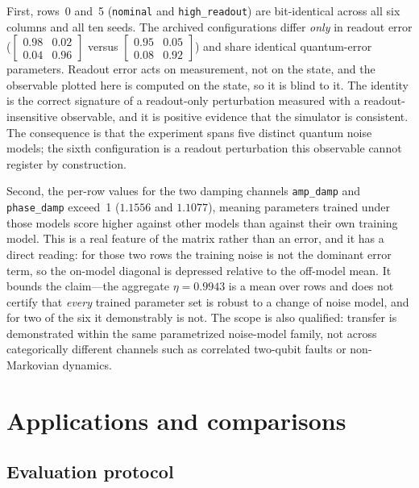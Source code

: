 \documentclass[twocolumn,aps,prl,superscriptaddress,showkeys]{revtex4-2}
\theoremstyle{plain}
\theoremstyle{definition}
\begin{document}
First, rows~0 and~5 (\texttt{nominal} and \texttt{high\_readout}) are bit-identical across all six columns and all ten seeds. The archived configurations differ \emph{only} in readout error ($\left[\begin{smallmatrix}0.98&0.02\\0.04&0.96\end{smallmatrix}\right]$ versus $\left[\begin{smallmatrix}0.95&0.05\\0.08&0.92\end{smallmatrix}\right]$) and share identical quantum-error parameters. Readout error acts on measurement, not on the state, and the observable plotted here is computed on the state, so it is blind to it. The identity is the correct signature of a readout-only perturbation measured with a readout-insensitive observable, and it is positive evidence that the simulator is consistent. The consequence is that the experiment spans five distinct quantum noise models; the sixth configuration is a readout perturbation this observable cannot register by construction.

Second, the per-row values for the two damping channels \texttt{amp\_damp} and \texttt{phase\_damp} exceed~1 ($1.1556$ and $1.1077$), meaning parameters trained under those models score higher against other models than against their own training model. This is a real feature of the matrix rather than an error, and it has a direct reading: for those two rows the training noise is not the dominant error term, so the on-model diagonal is depressed relative to the off-model mean. It bounds the claim---the aggregate $\eta=0.9943$ is a mean over rows and does not certify that \emph{every} trained parameter set is robust to a change of noise model, and for two of the six it demonstrably is not. The scope is also qualified: transfer is demonstrated within the same parametrized noise-model family, not across categorically different channels such as correlated two-qubit faults or non-Markovian dynamics.%
\section{Applications and comparisons}
\label{sec:applications}

\subsection{Evaluation protocol}
\end{document}
